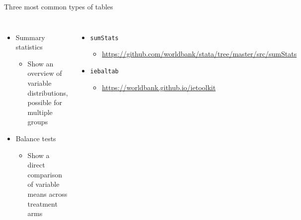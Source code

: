 \documentclass[aspectratio=169]{beamer}
\begin{document}
\begin{frame}[fragile]{Three most common types of tables}
	\begin{columns}[c]
		\begin{itemize}
			\item Summary statistics
			\begin{itemize}
				\item Show an overview of variable distributions, possible for multiple groups
			\end{itemize}
			\item Balance tests
			\begin{itemize}
				\item Show a direct comparison of variable means across treatment arms
			\end{itemize}
		\end{itemize}

		\begin{itemize}
			\item \texttt{sumStats}
			\begin{itemize}
				\item \url{https://github.com/worldbank/stata/tree/master/src/sumStats}
			\end{itemize}
			\item \texttt{iebaltab}
			\begin{itemize}
				\item \url{https://worldbank.github.io/ietoolkit}
			\end{itemize}
		\end{itemize}
	\end{columns}
\end{frame}
\end{document}
